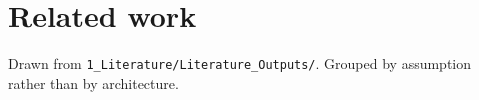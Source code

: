 \section{Related work}
\label{sec:related}

Drawn from \texttt{1\_Literature/Literature\_Outputs/}. Grouped by assumption rather than
by architecture.
